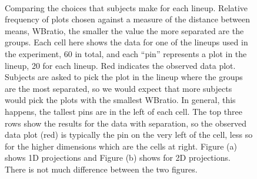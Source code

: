 \begin{figure}[htbp]
\centering
\mbox{\quad
{}}
\caption{Comparing the choices that subjects make for each lineup. Relative frequency of plots chosen against a measure of the distance between means, WBratio, the smaller the value the more separated are the groups. Each cell here shows the data for one of the lineups used in the experiment, 60 in total, and each ``pin'' represents a plot in the lineup, 20 for each lineup. Red indicates the observed data plot. Subjects are asked to pick the plot in the lineup where the groups are the most separated, so we would expect that more subjects would pick the plots with the smallest WBratio. In general, this happens, the tallest pins are in the left of each cell. The top three rows show the results for the data with separation, so the observed data plot (red) is typically the pin on the very left of the cell, less so for the higher dimensions which are the cells at right. Figure (a) shows 1D projections and Figure (b) shows for 2D projections. There is not much difference between the two figures. } 
\label{wbratio}
\end{figure}

